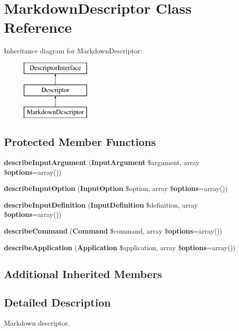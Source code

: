 \section{Markdown\+Descriptor Class Reference}
\label{class_symfony_1_1_component_1_1_console_1_1_descriptor_1_1_markdown_descriptor}
Inheritance diagram for Markdown\+Descriptor\+:\begin{figure}[H]
\begin{center}
\leavevmode
\includegraphics[height=3.000000cm]{class_symfony_1_1_component_1_1_console_1_1_descriptor_1_1_markdown_descriptor}
\end{center}
\end{figure}
\subsection*{Protected Member Functions}
\begin{DoxyCompactItemize}
\item 
{\bf describe\+Input\+Argument} ({\bf Input\+Argument} \$argument, array \${\bf options}=array())
\item 
{\bf describe\+Input\+Option} ({\bf Input\+Option} \$option, array \${\bf options}=array())
\item 
{\bf describe\+Input\+Definition} ({\bf Input\+Definition} \$definition, array \${\bf options}=array())
\item 
{\bf describe\+Command} ({\bf Command} \$command, array \${\bf options}=array())
\item 
{\bf describe\+Application} ({\bf Application} \$application, array \${\bf options}=array())
\end{DoxyCompactItemize}
\subsection*{Additional Inherited Members}


\subsection{Detailed Description}
Markdown descriptor.


